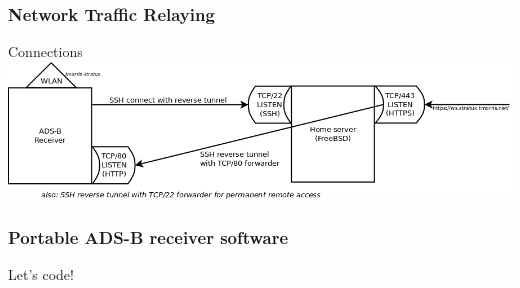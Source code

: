 \begin{frame}
\frametitle{Network Traffic Relaying}
\begin{block}{Connections}
\includegraphics[height=0.32\textheight]{image/adsb-networking.png}
\end{block}
\end{frame}

\begin{frame}
\frametitle{Portable ADS-B receiver software}
\begin{center}
Let's code!
\end{center}
\end{frame}

